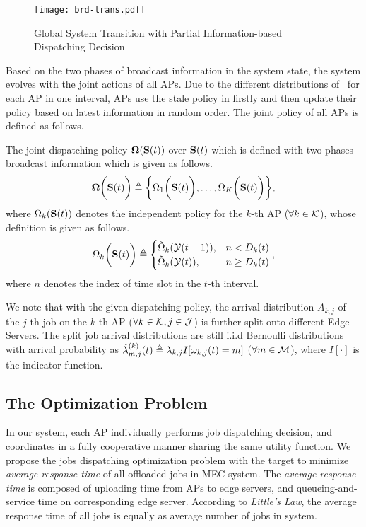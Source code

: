 \begin{figure}[ht]
    \centering
    \texttt{[image: brd-trans.pdf]}
    \caption{Global System Transition with Partial Information-based Dispatching Decision}
    \label{fig:brd-trans}
\end{figure}

Based on the two phases of broadcast information in the system state, the system evolves with the joint actions of all APs.
Due to the different distributions of \brdelay~for each AP in one interval, APs use the stale policy in firstly and then update their policy based on latest information in random order.
The joint policy of all APs is defined as follows.
\begin{definition}
    The joint dispatching policy $\boldsymbol{\Omega}(\mathbf{S}({t}))$ over $\mathbf{S}({t})$ which is defined with two phases broadcast information which is given as follows.
    \begin{align}
        \boldsymbol{\Omega}\bigg(\mathbf{S}({t})\bigg) \triangleq \bigg\{
            \Omega_{1}\bigg(\mathbf{S}({t})\bigg), \dots, \Omega_{K}\bigg(\mathbf{S}({t})\bigg)
        \bigg\},
    \end{align}
    where
    $\Omega_{k}(\mathbf{S}({t}))$ denotes the independent policy for the $k$-th AP ($\forall k\in\mathcal{K}$), whose definition is given as follows.
    \begin{align}
        \Omega_{k}\bigg(\mathbf{S}({t})\bigg) \triangleq
        \begin{cases}
            \tilde{\Omega}_{k}( \mathcal{Y}({t-1}) ), &n <    D_{k}({t})
            \\
            \tilde{\Omega}_{k}( \mathcal{Y}({t}) ),   &n \geq D_{k}({t})
        \end{cases},
    \end{align}
    where $n$ denotes the index of time slot in the $t$-th interval.
\end{definition}

We note that with the given dispatching policy, the arrival distribution $A_{k,j}$ of the $j$-th job on the $k$-th AP ($\forall k\in\mathcal{K}, j\in\mathcal{J}$) is further split onto different Edge Servers.
The split job arrival distributions are still i.i.d Bernoulli distributions with arrival probability as 
$\tilde{\lambda}^{(k)}_{m,j}({t}) \triangleq \lambda_{k,j} I[\omega_{k,j}({t}) = m]$ ($\forall m\in\mathcal{M}$), where $I[\cdot]$ is the indicator function.

\subsection{The Optimization Problem}
In our system, each AP individually performs job dispatching decision, and coordinates in a fully cooperative manner sharing the same utility function.
We propose the jobs dispatching optimization problem with the target to minimize \emph{average response time} of all offloaded jobs in MEC system.
The \emph{average response time} is composed of uploading time from APs to edge servers, and queueing-and-service time on corresponding edge server. According to \emph{Little's Law}, the average response time of all jobs is equally as average number of jobs in system.


